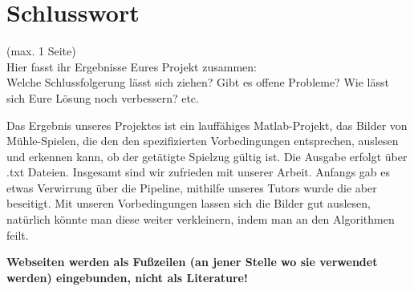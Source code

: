 \documentclass[paper=A4, deutsch]{scrartcl}
\begin{document}
\section{Schlusswort}
(max. 1 Seite)\\
Hier fasst ihr Ergebnisse Eures Projekt zusammen:\\
Welche Schlussfolgerung lässt sich ziehen? Gibt es offene Probleme? Wie lässt sich Eure Lösung noch verbessern? etc.

Das Ergebnis unseres Projektes ist ein lauffähiges Matlab-Projekt, das Bilder von Mühle-Spielen, die den den spezifizierten Vorbedingungen entsprechen, auslesen und erkennen kann, ob der getätigte Spielzug gültig ist. Die Ausgabe erfolgt über .txt Dateien. 
Insgesamt sind wir zufrieden mit unserer Arbeit. Anfangs gab es etwas Verwirrung über die Pipeline, mithilfe unseres Tutors wurde die aber beseitigt.
Mit unseren Vorbedingungen lassen sich die Bilder gut auslesen, natürlich könnte man diese weiter verkleinern, indem man an den Algorithmen feilt.





\textbf{Webseiten werden als Fußzeilen (an jener Stelle wo sie verwendet werden) eingebunden, nicht als Literature!}
\end{document}
